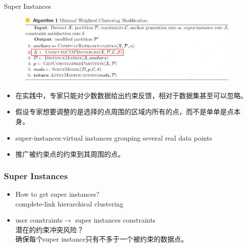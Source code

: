 \documentclass{beamer}
\begin{document}
\begin{frame}{Super Instances}
\begin{figure}
    \centering
    \includegraphics[width=0.8\linewidth]{./images/super.jpg}
\end{figure} 
\begin{itemize}
    \item 在实践中，专家只能对少数数据给出约束反馈，相对于数据集甚至可以忽略。
    \item 假设专家想要调整的是选择的点周围的区域内所有的点，而不是单单是点本身。
    \item super-instances:virtual instances grouping several real data points
    \item 推广被约束点的约束到其周围的点。
\end{itemize}




\end{frame}

\begin{frame}
    \frametitle{Super Instances}

    \begin{itemize}
        \item How to get super instances?\\
        complete-link hierarchical clustering
        \item user constraints$\rightarrow$ super instances constraints\\
        潜在的约束冲突风险？\\
        确保每个super instance只有不多于一个被约束的数据点。
    \end{itemize}
    

\end{frame}
\end{document}
